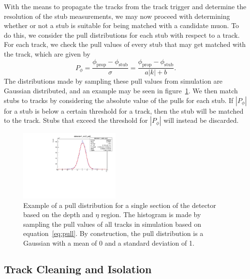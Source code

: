 With the means to propagate the tracks from the track trigger and determine the resolution of the stub measurements, we may now proceed with determining whether or not a stub is suitable for being matched with a candidate muon.
To do this, we consider the pull distributions for each stub with respect to a track.
For each track, we check the pull values of every stub that may get matched with the track, which are given by
\begin{equation}\label{eq:pull}
  P_\phi=\frac{\phi_\mathrm{prop}-\phi_\mathrm{stub}}{\sigma}=\frac{\phi_\mathrm{prop}-\phi_\mathrm{stub}}{a|k|+b}.
\end{equation}
The distributions made by sampling these pull values from simulation are Gaussian distributed, and an example may be seen in figure~\ref{fig:deltaPhiPull}.
We then match stubs to tracks by considering the absolute value of the pulls for each stub.
If $|P_\phi|$ for a stub is below a certain threshold for a track, then the stub will be matched to the track.
Stubs that exceed the threshold for $|P_\phi|$ will instead be discarded.

\begin{figure}[htbp] %
  \centering
  \includegraphics[width=0.45\textwidth]{fig/TPS/deltaPhi_pull.pdf}
  \caption{
    Example of a pull distribution for a single section of the detector based on the depth and $\eta$ region.
    The histogram is made by sampling the pull values of all tracks in simulation based on equation~\ref{eq:pull}.
    By construction, the pull distribution is a Gaussian with a mean of 0 and a standard deviation of 1.
  }
  \label{fig:deltaPhiPull}
\end{figure}


\subsection{Track Cleaning and Isolation}
\label{subsec:cleaning}

